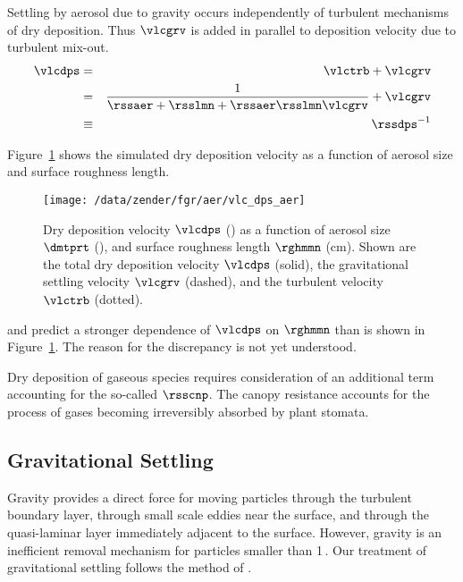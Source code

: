 \documentclass[12pt,twoside]{book}
\begin{document}
Settling by aerosol due to gravity occurs independently of turbulent 
mechanisms of dry deposition.
Thus $\vlcgrv$ is added in parallel to deposition velocity due to
turbulent mix-out.
\begin{eqnarray}
\vlcdps & = & \vlctrb + \vlcgrv \nonumber \\
\label{eqn:vlc_dps_dfn}
& = & \frac{1}{\rssaer + \rsslmn + \rssaer \rsslmn \vlcgrv } + \vlcgrv \\
\label{eqn:rss_dps_dfn}
& \equiv & \rssdps^{-1}
\end{eqnarray}

Figure~\ref{fgr:vlc_dps_aer} shows the simulated dry deposition velocity
as a function of aerosol size and surface roughness length.
\begin{figure*}
\begin{center}
\texttt{[image: /data/zender/fgr/aer/vlc\_dps\_aer]}\vfill
\end{center}
\caption[Dry Deposition Velocity]{
Dry deposition velocity $\vlcdps$ (\cmxs) as a function of aerosol
size $\dmtprt$ (\um), and surface roughness length $\rghmmn$ (cm).
Shown are the total dry deposition velocity $\vlcdps$ (solid), 
the gravitational settling velocity $\vlcgrv$ (dashed), and the
turbulent velocity $\vlctrb$ (dotted).
\label{fgr:vlc_dps_aer}}
\end{figure*}
\cite{SeH78} and \cite{Seh80} predict a stronger dependence of
$\vlcdps$ on $\rghmmn$ than is shown in Figure~\ref{fgr:vlc_dps_aer}.
The reason for the discrepancy is not yet understood.

Dry deposition of gaseous species requires consideration of an
additional term accounting for the so-called  $\rsscnp$. 
The canopy resistance accounts for the process of gases becoming
irreversibly absorbed by plant stomata.

\subsection[Gravitational Settling]{Gravitational
Settling}\label{sxn:grv} 
Gravity provides a direct force for moving particles through the
turbulent boundary layer, through small scale eddies near the surface,
and through the quasi-laminar layer immediately adjacent to the
surface. 
However, gravity is an inefficient removal mechanism for particles
smaller than 1\,\um.
Our treatment of gravitational settling follows the method of
\cite{SeP97}. 
\end{document}
